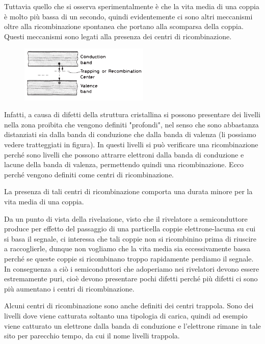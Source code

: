Tuttavia quello che si osserva sperimentalmente è che la vita media di una coppia è molto più bassa di un secondo, quindi evidentemente ci sono altri meccanismi oltre alla ricombinazione spontanea che portano alla scomparsa della coppia. Questi meccanismi sono legati alla presenza dei centri di ricombinazione.

\begin{figure}[H]
   \centering
   \includegraphics[width=0.55\textwidth]{immagini/centri_di_ricombinazione.png}
\end{figure}

Infatti, a causa di difetti della struttura cristallina si possono presentare dei livelli nella zona proibita che vengono definiti "profondi", nel senso che sono abbastanza distanziati sia dalla banda di conduzione che dalla banda di valenza (li possiamo vedere tratteggiati in figura). In questi livelli si può verificare una ricombinazione perché sono livelli che possono attrarre elettroni dalla banda di conduzione e lacune della banda di valenza, permettendo quindi una ricombinazione. Ecco perché vengono definiti come centri di ricombinazione.

La presenza di tali centri di ricombinazione comporta una durata minore per la vita media di una coppia.

\vspace{0.2cm}Da un punto di vista della rivelazione, visto che il rivelatore a semiconduttore produce per effetto del passaggio di una particella coppie elettrone-lacuna su cui si basa il segnale, ci interessa che tali coppie non si ricombinino prima di riuscire a raccoglierle, dunque non vogliamo che la vita media sia eccessivamente bassa perché se queste coppie si ricombinano troppo rapidamente perdiamo il segnale. In conseguenza a ciò i semiconduttori che adoperiamo nei rivelatori devono essere estremamente puri, cioè devono presentare pochi difetti perché più difetti ci sono più aumentano i centri di ricombinazione.

Alcuni centri di ricombinazione sono anche definiti dei centri trappola. Sono dei livelli dove viene catturata soltanto una tipologia di carica, quindi ad esempio viene catturato un elettrone dalla banda di conduzione e l'elettrone rimane in tale sito per parecchio tempo, da cui il nome livelli trappola.

